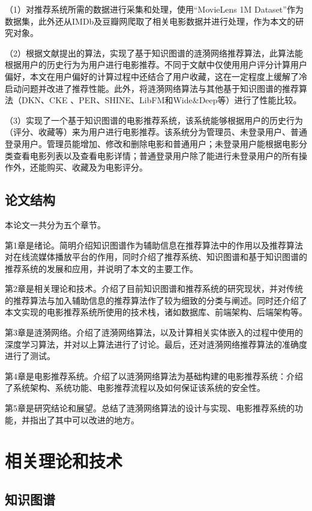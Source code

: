 \documentclass{bjfuthesis}
\begin{document}
（1）对推荐系统所需的数据进行采集和处理，使用“MovieLens 1M Dataset”作为数据集，此外还从IMDb及豆瓣网爬取了相关电影数据并进行处理，作为本文的研究对象。

（2）根据文献\parencite{wang2018ripplenet}提出的算法，实现了基于知识图谱的涟漪网络推荐算法，此算法能根据用户的历史行为为用户进行电影推荐。不同于文献\parencite{wang2018ripplenet}中仅使用用户评分计算用户偏好，本文在用户偏好的计算过程中还结合了用户收藏，这在一定程度上缓解了冷启动问题并改进了推荐性能。此外，将涟漪网络算法与其他基于知识图谱的推荐算法（DKN\cite{wang2018dkn}、CKE\cite{zhang2016collaborative} 、PER\cite{yu2014personalized}、SHINE\cite{wang2018shine}、LibFM\cite{rendle2012factorization}和Wide\&Deep\cite{cheng2016wide}等）进行了性能比较。

（3）实现了一个基于知识图谱的电影推荐系统，该系统能够根据用户的历史行为（评分、收藏等）来为用户进行电影推荐。该系统分为管理员、未登录用户、普通登录用户。管理员能增加、修改和删除电影和普通用户；未登录用户能根据电影分类查看电影列表以及查看电影详情；普通登录用户除了能进行未登录用户的所有操作外，还能购买、收藏及为电影评分。
\section{论文结构}
本论文一共分为五个章节。

第1章是绪论。简明介绍知识图谱作为辅助信息在推荐算法中的作用以及推荐算法对在线流媒体播放平台的作用，同时介绍了推荐系统、知识图谱和基于知识图谱的推荐系统的发展和应用，并说明了本文的主要工作。

第2章是相关理论和技术。介绍了目前知识图谱和推荐系统的研究现状，并对传统的推荐算法与加入辅助信息的推荐算法作了较为细致的分类与阐述。同时还介绍了本文实现的电影推荐系统所使用的技术栈，诸如数据库、前端架构、后端架构等。

第3章是涟漪网络。介绍了涟漪网络算法，以及计算相关实体嵌入的过程中使用的深度学习算法，并对以上算法进行了讨论。最后，还对涟漪网络推荐算法的准确度进行了测试。

第4章是电影推荐系统。介绍了以涟漪网络算法为基础构建的电影推荐系统：介绍了系统架构、系统功能、电影推荐流程以及如何保证该系统的安全性。

第5章是研究结论和展望。总结了涟漪网络算法的设计与实现、电影推荐系统的功能，并指出了其中可以改进的地方。
\chapter{相关理论和技术}
\section{知识图谱}
\end{document}
